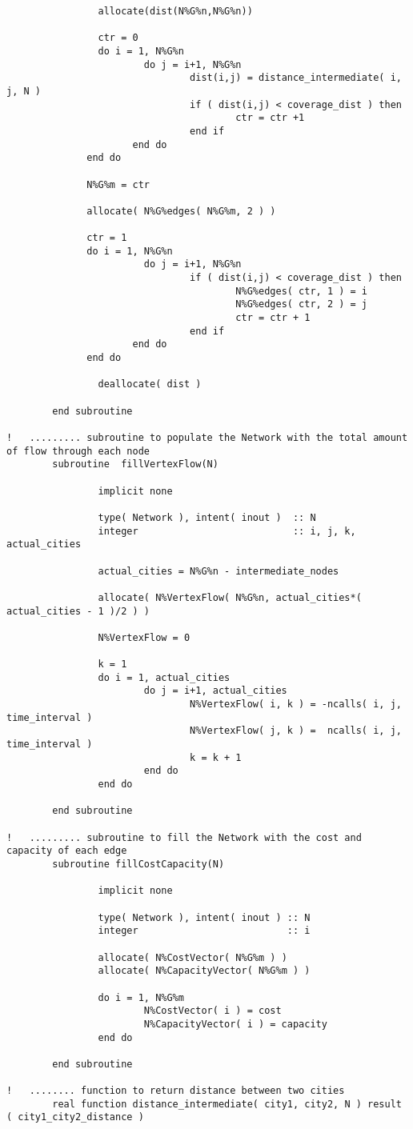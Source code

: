 \documentclass[10pt,a4paper,margin = 1.25cm]{article}
\begin{document}
\begin{lstlisting}
				allocate(dist(N%G%n,N%G%n))
				
				ctr = 0
				do i = 1, N%G%n
						do j = i+1, N%G%n
								dist(i,j) = distance_intermediate( i, j, N )
								if ( dist(i,j) < coverage_dist ) then
										ctr = ctr +1
								end if				
					  end do
			  end do
			  
			  N%G%m = ctr

			  allocate( N%G%edges( N%G%m, 2 ) )
			  
			  ctr = 1
			  do i = 1, N%G%n
						do j = i+1, N%G%n
								if ( dist(i,j) < coverage_dist ) then
										N%G%edges( ctr, 1 ) = i
										N%G%edges( ctr, 2 ) = j
										ctr = ctr + 1
								end if				
					  end do
			  end do
	
				deallocate( dist )	
				
		end subroutine
		
!   ......... subroutine to populate the Network with the total amount of flow through each node
		subroutine  fillVertexFlow(N)
		
				implicit none
				
				type( Network ), intent( inout )  :: N
				integer                           :: i, j, k, actual_cities
				
				actual_cities = N%G%n - intermediate_nodes
				
				allocate( N%VertexFlow( N%G%n, actual_cities*( actual_cities - 1 )/2 ) )
				
				N%VertexFlow = 0
				
				k = 1
				do i = 1, actual_cities
						do j = i+1, actual_cities						
								N%VertexFlow( i, k ) = -ncalls( i, j, time_interval )
								N%VertexFlow( j, k ) =  ncalls( i, j, time_interval )
								k = k + 1
						end do
				end do
				
		end subroutine
		
!   ......... subroutine to fill the Network with the cost and capacity of each edge
		subroutine fillCostCapacity(N)
		
				implicit none
				
				type( Network ), intent( inout ) :: N
				integer                          :: i
				
				allocate( N%CostVector( N%G%m ) )
				allocate( N%CapacityVector( N%G%m ) )
				
				do i = 1, N%G%m
						N%CostVector( i ) = cost
						N%CapacityVector( i ) = capacity
				end do
		
		end subroutine
				
!   ........ function to return distance between two cities				
		real function distance_intermediate( city1, city2, N ) result ( city1_city2_distance )
				

\end{lstlisting}
\end{document}
